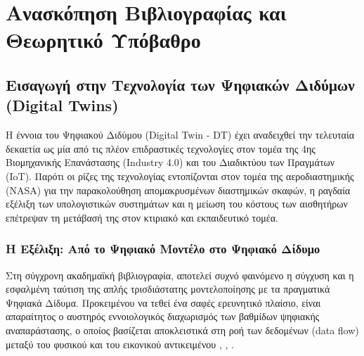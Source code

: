 \chapter{Ανασκόπηση Βιβλιογραφίας και Θεωρητικό Υπόβαθρο}

\section{Εισαγωγή στην Τεχνολογία των Ψηφιακών Διδύμων (\textlatin{Digital Twins})}
Η έννοια του Ψηφιακού Διδύμου (\textlatin{Digital Twin - DT}) έχει αναδειχθεί την τελευταία δεκαετία ως μία από τις πλέον επιδραστικές τεχνολογίες στον τομέα της 4ης Βιομηχανικής Επανάστασης (\textlatin{Industry 4.0}) και του Διαδικτύου των Πραγμάτων (\textlatin{IoT}). Παρότι οι ρίζες της τεχνολογίας εντοπίζονται στον τομέα της αεροδιαστημικής (\textlatin{NASA}) για την παρακολούθηση απομακρυσμένων διαστημικών σκαφών, η ραγδαία εξέλιξη των υπολογιστικών συστημάτων και η μείωση του κόστους των αισθητήρων επέτρεψαν τη μετάβασή της στον κτιριακό και εκπαιδευτικό τομέα.

\subsection{Η Εξέλιξη: Από το Ψηφιακό Μοντέλο στο Ψηφιακό Δίδυμο}
Στη σύγχρονη ακαδημαϊκή βιβλιογραφία, αποτελεί συχνό φαινόμενο η σύγχυση και η εσφαλμένη ταύτιση της απλής τρισδιάστατης μοντελοποίησης με τα πραγματικά Ψηφιακά Δίδυμα. Προκειμένου να τεθεί ένα σαφές ερευνητικό πλαίσιο, είναι απαραίτητος ο αυστηρός εννοιολογικός διαχωρισμός των βαθμίδων ψηφιακής αναπαράστασης, ο οποίος βασίζεται αποκλειστικά στη ροή των δεδομένων (\textlatin{data flow}) μεταξύ του φυσικού και του εικονικού αντικειμένου \cite{Grieves2017}, \cite{Kritzinger2018}, \cite{Fuller2020}.

